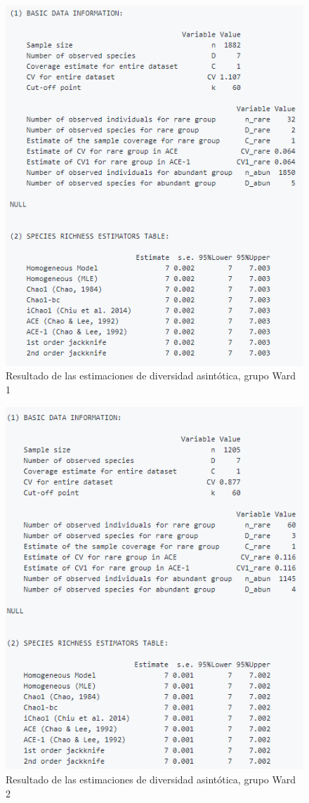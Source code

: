 \documentclass[11pt,]{article}
\begin{document}
\begin{figure}
\centering
\includegraphics{asintotico_ward1.png}
\caption{Resultado de las estimaciones de diversidad asintótica, grupo
Ward 1 \label{fig:asintotico_ward1}}
\end{figure}

\begin{figure}
\centering
\includegraphics{asintotico_ward2.png}
\caption{Resultado de las estimaciones de diversidad asintótica, grupo
Ward 2 \label{fig:asintotico_ward2}}
\end{figure}
\end{document}
